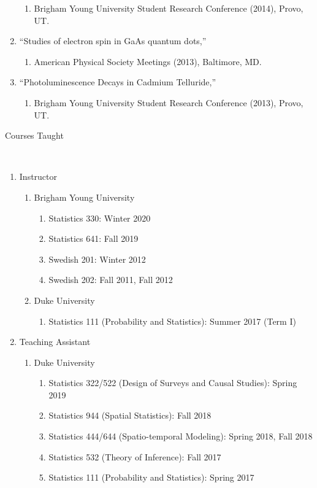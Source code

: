 \documentclass[12pt]{article}
\newcommand{\head}[1]{ %
    \bigskip %
    \begin{large}\begin{bf}{#1}\end{bf}\end{large} %

    \ \\ [-1.3cm] %

    \hrulefill}
\begin{document}
\begin{enumerate}[label=$\bullet$]
\begin{enumerate}[label=$\cdot$]
\item Brigham Young University Student Research Conference (2014), Provo, UT.
\end{enumerate}
\item  ``Studies of electron spin in GaAs quantum dots,''
\begin{enumerate}[label=$\cdot$]
\item  American Physical Society Meetings (2013), Baltimore, MD.
\end{enumerate}
\item  ``Photoluminescence Decays in Cadmium Telluride,'' 
\begin{enumerate}[label=$\cdot$]
\item Brigham Young University Student Research Conference (2013), Provo, UT.
\end{enumerate}
\end{enumerate}

\head{Courses Taught}

\begin{enumerate}[label=$\bullet$]
\item Instructor
\begin{enumerate}[label=$\cdot$]
\item Brigham Young University
\begin{enumerate}[label=$\cdot$]
\item Statistics 330: Winter 2020
\item Statistics 641: Fall 2019
\item Swedish 201: Winter 2012 
\item Swedish 202: Fall 2011, Fall 2012
\end{enumerate}
\item Duke University
\begin{enumerate}[label=$\cdot$]
\item Statistics 111 (Probability and Statistics): Summer 2017 (Term I)
\end{enumerate}
\end{enumerate}
\item Teaching Assistant
\begin{enumerate}[label=$\cdot$]
\item Duke University
\begin{enumerate}[label=$\cdot$]
\item Statistics 322/522 (Design of Surveys and Causal Studies): Spring 2019
\item Statistics 944 (Spatial Statistics): Fall 2018
\item Statistics 444/644 (Spatio-temporal Modeling): Spring 2018, Fall 2018
\item Statistics 532 (Theory of Inference): Fall 2017
\item Statistics 111 (Probability and Statistics): Spring 2017 
\end{enumerate}
\end{enumerate}
\end{enumerate}
\end{document}
